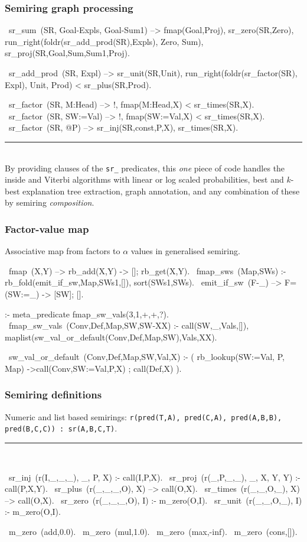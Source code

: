 \documentclass[usenames,dvipsnames]{beamer}
\newenvironment{isframe}[1][untitled]{\begin{frame}[fragile=singleslide,environment=isframe]\frametitle{#1}}{\end{frame}}
\def\pl#1{\lstinline[language={[SWI]Prolog},columns=fullflexible]{#1}}
\begin{document}
\begin{isframe}[Semiring graph processing]
\begin{prolog}[xleftmargin=0em,basicstyle=\small]
  ~sr_sum~(SR, Goal-Expls, Goal-Sum1) -->
     fmap(Goal,Proj), {sr_zero(SR,Zero)},
     run_right(foldr(sr_add_prod(SR),Expls), Zero, Sum),
     {sr_proj(SR,Goal,Sum,Sum1,Proj)}.

  ~sr_add_prod~(SR, Expl) -->
     {sr_unit(SR,Unit)},
     run_right(foldr(sr_factor(SR), Expl), Unit, Prod) <\> sr_plus(SR,Prod).

  ~sr_factor~(SR, M:Head)  --> !, fmap(M:Head,X) <\> sr_times(SR,X).
  ~sr_factor~(SR, SW:=Val) --> !, fmap(SW:=Val,X) <\> sr_times(SR,X).
  ~sr_factor~(SR, @P)  --> {sr_inj(SR,const,P,X)}, \> sr_times(SR,X).
\end{prolog}
\vspace{-1.5em}
\rule{\linewidth}{0.4pt}\\
By providing clauses of the \pl{sr_} predicates, this \emph{one} piece of code
handles the inside and Viterbi algorithms with linear or log scaled probabilities,
best and $k$-best explanation tree extraction, graph annotation, and any combination
of these by semiring \emph{composition}.
\end{isframe}

\begin{isframe}[Factor-value map]
Associative map from factors to $\alpha$ values in generalised semiring.
\begin{prolog}[xleftmargin=0em,basicstyle=\small]
  ~fmap~(X,Y) --> rb_add(X,Y) -> []; rb_get(X,Y).
  ~fmap_sws~(Map,SWs) :- 
    rb_fold(emit_if_sw,Map,SWs1,[]), 
    sort(SWs1,SWs).
  ~emit_if_sw~(F-_) --> {F=(SW:=_)} -> [SW]; [].

  :- meta_predicate fmap_sw_vals(3,1,+,+,?).
  ~fmap_sw_vals~(Conv,Def,Map,SW,SW-XX) :-
     call(SW,_,Vals,[]), 
     maplist(sw_val_or_default(Conv,Def,Map,SW),Vals,XX).

  ~sw_val_or_default~(Conv,Def,Map,SW,Val,X) :-
     (  rb_lookup(SW:=Val, P, Map) 
     ->call(Conv,SW:=Val,P,X)
     ;  call(Def,X)
     ).
\end{prolog}
\end{isframe}

\begin{isframe}[Semiring definitions]
Numeric and list based semirings: \pl{r(pred(T,A), pred(C,A), pred(A,B,B), pred(B,C,C)) : sr(A,B,C,T)}.
\rule{\linewidth}{0.4pt}\\
\begin{prolog}[xleftmargin=0em,basicstyle=\small]
  ~sr_inj~(r(I,_,_,_),  _, P, X)     :- call(I,P,X).
  ~sr_proj~(r(_,P,_,_), _, X, Y, Y) :- call(P,X,Y).
  ~sr_plus~(r(_,_,_,O), X) --> call(O,X).
  ~sr_times~(r(_,_,O,_), X) --> call(O,X).
  ~sr_zero~(r(_,_,_,O), I) :- m_zero(O,I).
  ~sr_unit~(r(_,_,O,_), I) :- m_zero(O,I).

  ~m_zero~(add,0.0).
  ~m_zero~(mul,1.0).
  ~m_zero~(max,-inf).
  ~m_zero~(cons,[]).
\end{prolog}
\end{isframe}
\end{document}
